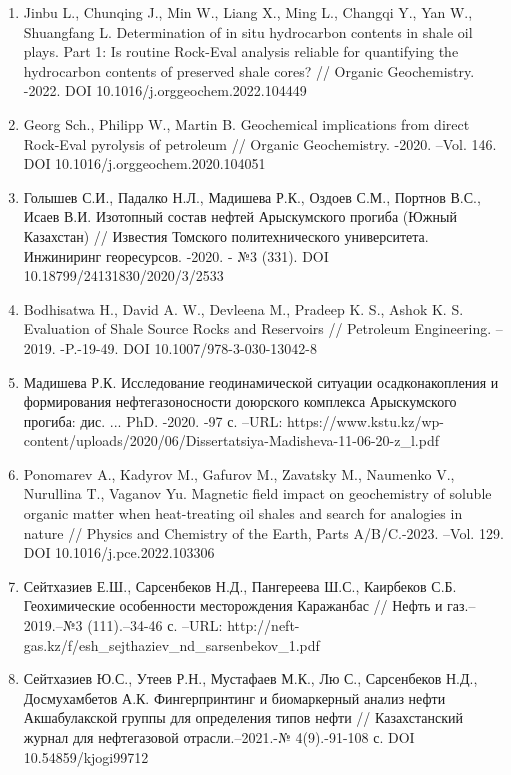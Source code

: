 \begin{enumerate}
\item
  Jinbu L., Chunqing J., Min W., Liang X., Ming L., Changqi Y., Yan W.,
  Shuangfang L. Determination of in situ hydrocarbon contents in shale
  oil plays. Part 1: Is routine Rock-Eval analysis reliable for
  quantifying the hydrocarbon contents of preserved shale cores? //
  Organic Geochemistry. -2022. DOI 10.1016/j.orggeochem.2022.104449
\item
  Georg Sch., Philipp W., Martin B. Geochemical implications from direct
  Rock-Eval pyrolysis of petroleum // Organic Geochemistry. -2020.
  --Vol. 146. DOI 10.1016/j.orggeochem.2020.104051
\item
  Голышев С.И., Падалко Н.Л., Мадишева Р.К., Оздоев С.М., Портнов В.С.,
  Исаев В.И. Изотопный состав нефтей Арыскумского прогиба (Южный
  Казахстан) // Известия Томского политехнического университета.
  Инжиниринг георесурсов. -2020. - №3 (331). DOI
  10.18799/24131830/2020/3/2533
\item
  Bodhisatwa H., David A. W., Devleena M., Pradeep K. S., Ashok K. S.
  Evaluation of Shale Source Rocks and Reservoirs // Petroleum
  Engineering. --2019. -P.-19-49. DOI 10.1007/978-3-030-13042-8
\item
  Мадишева Р.К. Исследование геодинамической ситуации осадконакопления и
  формирования нефтегазоносности доюрского комплекса Арыскумского
  прогиба: дис. ... PhD. -2020. -97 с. --URL:
  https://www.kstu.kz/wp-content/uploads/2020/06/Dissertatsiya-Madisheva-11-06-20-z\_l.pdf
\item
  Ponomarev A., Kadyrov M., Gafurov M., Zavatsky M., Naumenko V.,
  Nurullina T., Vaganov Yu. Magnetic field impact on geochemistry of
  soluble organic matter when heat-treating oil shales and search for
  analogies in nature // Physics and Chemistry of the Earth, Parts
  A/B/C.-2023. --Vol. 129. DOI 10.1016/j.pce.2022.103306
\item
  Сейтхазиев Е.Ш., Сарсенбеков Н.Д., Пангереева Ш.С., Каирбеков С.Б.
  Геохимические особенности месторождения Каражанбас // Нефть и
  газ.--2019.--№3 (111).--34-46 с. --URL:
  http://neft-gas.kz/f/esh\_sejthaziev\_nd\_sarsenbekov\_1.pdf
\item
  Сейтхазиев Ю.С., Утеев Р.Н., Мустафаев М.К., Лю С., Сарсенбеков Н.Д.,
  Досмухамбетов А.К. Фингерпринтинг и биомаркерный анализ нефти
  Акшабулакской группы для определения типов нефти // Казахстанский
  журнал для нефтегазовой отрасли.--2021.-№ 4(9).-91-108 с. DOI
  10.54859/kjogi99712
\end{enumerate}

